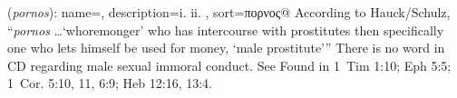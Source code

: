 \item[Male-sex-buyer,]

(\textit{pornos}):
{
    name=,
    description={i.  ii. },
    sort=πορνος@
}
According to Hauck/Schulz, ``\emph{pornos} \ldots `whoremonger' who has intercourse with prostitutes then specifically one who lets himself be used for money, `male prostitute'''
There is no word in CD regarding male sexual immoral conduct. See 
Found in 1~Tim 1:10; Eph 5:5; 1~Cor. 5:10, 11, 6:9; Heb 12:16, 13:4.
